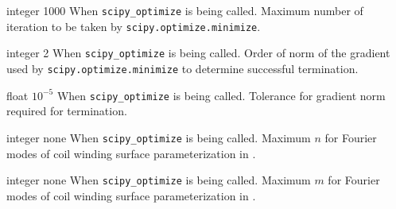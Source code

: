 \myhrule

{integer}
{1000}
{When \texttt{scipy\_optimize} is being called.}
{Maximum number of iteration to be taken by \texttt{scipy.optimize.minimize}.}

\myhrule

{integer}
{2}
{When \texttt{scipy\_optimize} is being called.}
{Order of norm of the gradient used by \texttt{scipy.optimize.minimize} to determine successful termination.}

\myhrule

{float}
{$10^{-5}$}
{When \texttt{scipy\_optimize} is being called.}
{Tolerance for gradient norm required for termination.}

\myhrule

{integer}
{none}
{When \texttt{scipy\_optimize} is being called.}
{Maximum $n$ for Fourier modes of coil winding surface parameterization in .}

\myhrule

{integer}
{none}
{When \texttt{scipy\_optimize} is being called.}
{Maximum $m$ for Fourier modes of coil winding surface parameterization in .}








